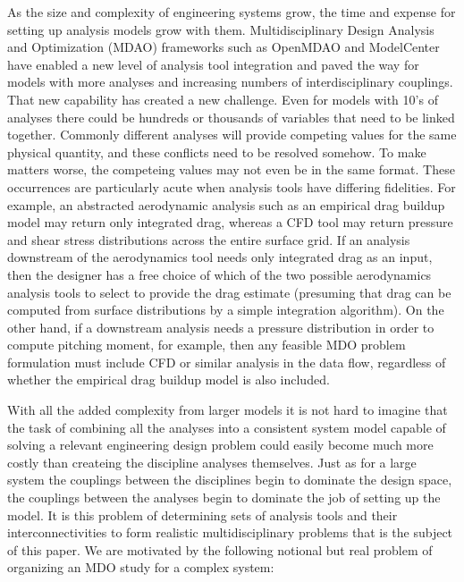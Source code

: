     As the size and complexity of engineering systems grow, the time and expense for setting up 
    analysis models grow with them. Multidisciplinary Design Analysis and Optimization (MDAO)
    frameworks such as OpenMDAO\cite{Gray2012} and ModelCenter have enabled a new level of analysis tool integration 
    and paved the way for models with more analyses and increasing numbers of interdisciplinary couplings. That 
    new capability has created a new challenge. Even for models with 10's of analyses there could be hundreds or thousands
    of variables that need to be linked together. Commonly different analyses will provide competing values for the 
    same physical quantity, and these conflicts need to be resolved somehow. To make matters worse, the competeing values 
    may not even be in the same format. These occurrences are particularly acute when analysis tools have differing fidelities. For
    example, an abstracted aerodynamic analysis such as an empirical drag buildup model may return only
    integrated drag, whereas a CFD tool may return pressure and shear stress distributions across the entire
    surface grid. If an analysis downstream of the aerodynamics tool needs only integrated drag as an input,
    then the designer has a free choice of which of the two possible aerodynamics analysis tools to select to
    provide the drag estimate (presuming that drag can be computed from surface distributions by a simple
    integration algorithm). On the other hand, if a downstream analysis needs a pressure distribution in
    order to compute pitching moment, for example, then any feasible MDO problem formulation must
    include CFD or similar analysis in the data flow, regardless of whether the empirical drag buildup model
    is also included.

    With all the added complexity from larger models it is not hard to imagine that the task of combining all the analyses into a 
    consistent system model capable of solving a relevant engineering design 
    problem could easily become much more costly than createing the discipline 
    analyses themselves. Just as for a large system the couplings between the 
    disciplines begin to dominate the design space, the couplings between the 
    analyses begin to dominate the job of setting up the model. It is this problem of 
    determining sets of analysis tools and their interconnectivities to form realistic
    multidisciplinary problems that is the subject of this paper. We are motivated by the following notional
    but real problem of organizing an MDO study for a complex system:

